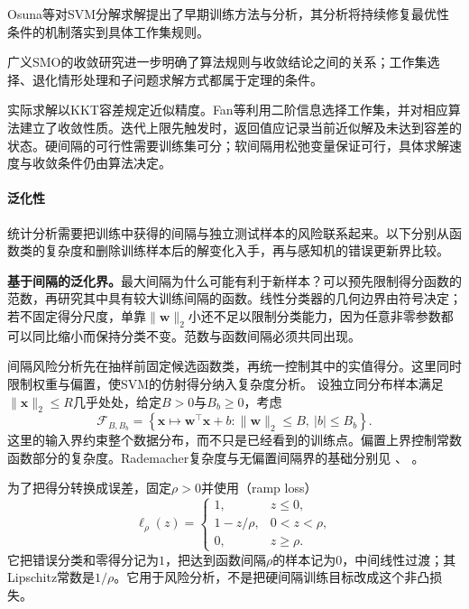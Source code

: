 Osuna等对SVM分解求解提出了早期训练方法与分析，其分析将持续修复最优性条件的机制落实到具体工作集规则。

广义SMO的收敛研究进一步明确了算法规则与收敛结论之间的关系；工作集选择、退化情形处理和子问题求解方式都属于定理的条件。

实际求解以KKT容差规定近似精度。Fan等利用二阶信息选择工作集，并对相应算法建立了收敛性质。迭代上限先触发时，返回值应记录当前近似解及未达到容差的状态。硬间隔的可行性需要训练集可分；软间隔用松弛变量保证可行，具体求解速度与收敛条件仍由算法决定。

\paragraph{泛化性}
\label{sec:classification-svm-generalization}

统计分析需要把训练中获得的间隔与独立测试样本的风险联系起来。以下分别从函数类的复杂度和删除训练样本后的解变化入手，再与感知机的错误更新界比较。

\label{sec:classification-svm-margin-generalization}

\textbf{基于间隔的泛化界。}最大间隔为什么可能有利于新样本？可以预先限制得分函数的范数，再研究其中具有较大训练间隔的函数。线性分类器的几何边界由符号决定；若不固定得分尺度，单靠$\lVert\bm{w}\rVert_2$小还不足以限制分类能力，因为任意非零参数都可以同比缩小而保持分类不变。范数与函数间隔必须共同出现。

间隔风险分析先在抽样前固定候选函数类，再统一控制其中的实值得分。这里同时限制权重与偏置，使SVM的仿射得分纳入复杂度分析。
设独立同分布样本满足$\lVert\bm{x}\rVert_2\le R$几乎处处，给定$B>0$与$B_b\ge0$，考虑
\[
  \mathcal{F}_{B,B_b}
  =\left\{
    \bm{x}\mapsto\bm{w}^{\top}\bm{x}+b:
    \lVert\bm{w}\rVert_2\le B,\ |b|\le B_b
   \right\}.
\]
这里的输入界约束整个数据分布，而不只是已经看到的训练点。偏置上界控制常数函数部分的复杂度。Rademacher复杂度与无偏置间隔界的基础分别见
、
。

为了把得分转换成误差，固定$\rho>0$并使用（ramp loss）
\begin{equation}
  \ell_\rho(z)=
  \begin{cases}
    1, & z\le0,\\
    1-z/\rho, & 0<z<\rho,\\
    0, & z\ge\rho.
  \end{cases}
  \label{eq:classification-svm-ramp}
\end{equation}
它把错误分类和零得分记为$1$，把达到函数间隔$\rho$的样本记为$0$，中间线性过渡；其Lipschitz常数是$1/\rho$。它用于风险分析，不是把硬间隔训练目标改成这个非凸损失。


